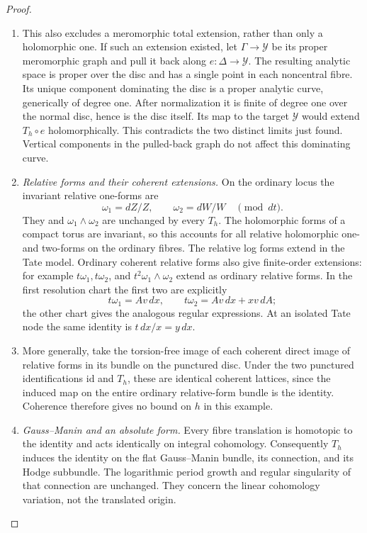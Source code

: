 \begin{proof}
\begin{enumerate}[label=\arabic*.,leftmargin=*]
\item This also excludes a meromorphic total
extension, rather than only a holomorphic
one. If such an extension existed, let
$\Gamma\to\mathcal Y$ be its proper
meromorphic graph and pull it back along
$e:\Delta\to\mathcal Y$. The resulting
analytic space is proper over the disc and
has a single point in each noncentral fibre.
Its unique component dominating the disc
is a proper analytic curve, generically of
degree one. After normalization it is finite
of degree one over the normal disc, hence
is the disc itself. Its map to the target
$\mathcal Y$ would extend $T_h\circ e$
holomorphically. This contradicts the two
distinct limits just found. Vertical
components in the pulled-back graph do
not affect this dominating curve.

\item \emph{Relative forms and their coherent extensions.}
On the ordinary locus the invariant relative
one-forms are
\[
 \omega_1=dZ/Z,\qquad \omega_2=dW/W
 \quad\pmod{dt}.
\]
They and $\omega_1\wedge\omega_2$ are
unchanged by every $T_h$. The holomorphic
forms of a compact torus are invariant, so
this accounts for all relative holomorphic
one- and two-forms on the ordinary fibres.
The relative log forms extend in the Tate
model. Ordinary coherent relative forms
also give finite-order extensions: for
example $t\omega_1,t\omega_2$, and
$t^2\omega_1\wedge\omega_2$ extend as
ordinary relative forms. In the first
resolution chart the first two are explicitly
\[
 t\omega_1=Av\,dx,\qquad
 t\omega_2=Av\,dx+xv\,dA;
\]
the other chart gives the analogous regular
expressions. At an isolated Tate node the
same identity is $t\,dx/x=y\,dx$.

\item More generally, take the torsion-free image
of each coherent direct image of relative
forms in its bundle on the punctured disc.
Under the two punctured identifications
$\mathrm{id}$ and $T_h$, these are identical
coherent lattices, since the induced map on
the entire ordinary relative-form bundle
is the identity. Coherence therefore gives
no bound on $h$ in this example.

\item \emph{Gauss--Manin and an absolute form.}
Every fibre translation is homotopic to the
identity and acts identically on integral
cohomology. Consequently $T_h$ induces the
identity on the flat Gauss--Manin bundle,
its connection, and its Hodge subbundle.
The logarithmic period growth and regular
singularity of that connection are unchanged.
They concern the linear cohomology variation,
not the translated origin.


\end{enumerate}
\end{proof}
